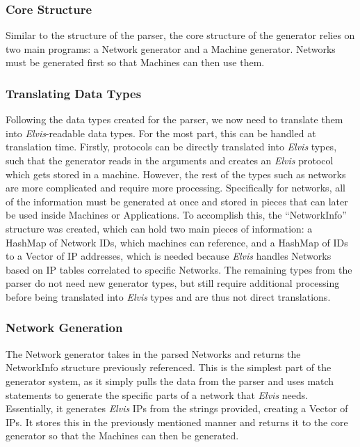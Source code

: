 \documentclass[journal]{IEEEtran} %
\newcommand{\elvis}{\textit{Elvis}}
\begin{document}
\subsubsection{Core Structure}
Similar to the structure of the parser, the core structure of the generator relies on two main programs: a Network generator and a Machine generator. Networks must be generated first so that Machines can then use them.

\subsubsection{Translating Data Types}
Following the data types created for the parser, we now need to translate them into \elvis{}-readable data types. For the most part, this can be handled at translation time. Firstly, protocols can be directly translated into \elvis{} types, such that the generator reads in the arguments and creates an \elvis{} protocol which gets stored in a machine. However, the rest of the types such as networks are more complicated and require more processing. 
Specifically for networks, all of the information must be generated at once and stored in pieces that can later be used inside Machines or Applications. To accomplish this, the “NetworkInfo” structure was created, which can hold two main pieces of information: a HashMap of Network IDs, which machines can reference, and a HashMap of IDs to a Vector of IP addresses, which is needed because \elvis{} handles Networks based on IP tables correlated to specific Networks.
The remaining types from the parser do not need new generator types, but still require additional processing before being translated into \elvis{} types and are thus not direct translations.


\subsubsection{Network Generation}
The Network generator takes in the parsed Networks and returns the NetworkInfo structure previously referenced. This is the simplest part of the generator system, as it simply pulls the data from the parser and uses match statements to generate the specific parts of a network that \elvis{} needs. Essentially, it generates \elvis{} IPs from the strings provided, creating a Vector of IPs. It stores this in the previously mentioned manner and returns it to the core generator so that the Machines can then be generated.
\end{document}
